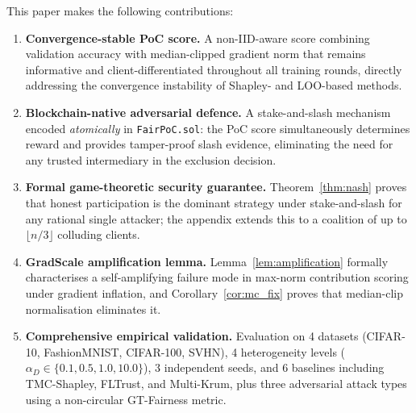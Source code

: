 \documentclass[journal]{IEEEtran}
\theoremstyle{definition}
\theoremstyle{remark}
\begin{document}
This paper makes the following contributions:
\begin{enumerate}
  \item \textbf{Convergence-stable PoC score.}
        A non-IID-aware score combining validation accuracy with
        median-clipped gradient norm that remains informative and
        client-differentiated throughout all training rounds,
        directly addressing the convergence instability of
        Shapley- and LOO-based methods.

  \item \textbf{Blockchain-native adversarial defence.}
        A stake-and-slash mechanism encoded \emph{atomically} in
        \texttt{FairPoC.sol}: the PoC score simultaneously
        determines reward and provides tamper-proof slash evidence,
        eliminating the need for any trusted intermediary in the
        exclusion decision.

  \item \textbf{Formal game-theoretic security guarantee.}
        Theorem~\ref{thm:nash} proves that honest participation is
        the dominant strategy under stake-and-slash for any rational
        single attacker; the appendix extends this to a coalition
        of up to $\lfloor n/3 \rfloor$ colluding clients.

  \item \textbf{GradScale amplification lemma.}
        Lemma~\ref{lem:amplification} formally characterises a
        self-amplifying failure mode in max-norm contribution
        scoring under gradient inflation, and
        Corollary~\ref{cor:mc_fix} proves that median-clip
        normalisation eliminates it.

  \item \textbf{Comprehensive empirical validation.}
        Evaluation on 4 datasets (CIFAR-10, FashionMNIST, CIFAR-100,
        SVHN), 4 heterogeneity levels
        ($\alpha_D \in \{0.1, 0.5, 1.0, 10.0\}$),
        3 independent seeds, and 6 baselines including TMC-Shapley,
        FLTrust, and Multi-Krum, plus three adversarial attack types
        using a non-circular GT-Fairness metric.
\end{enumerate}
\end{document}
